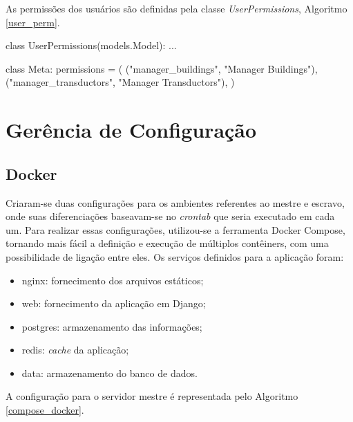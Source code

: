 As permissões dos usuários são definidas pela classe \textit{UserPermissions}, Algoritmo \ref{user_perm}.

\begin{python}[caption={Permissões presentes na classe \textit{UserPermissions}.}, captionpos=b,label={user_perm}]
class UserPermissions(models.Model):
    ...

    class Meta:
        permissions = (
            ("manager_buildings", "Manager Buildings"),
            ("manager_transductors", "Manager Transductors"),
        )
\end{python}

\section{Gerência de Configuração}

\subsection{Docker}
Criaram-se duas configurações para os ambientes referentes ao mestre e escravo, onde suas diferenciações baseavam-se no \textit{crontab} que seria executado em cada um. Para realizar essas configurações, utilizou-se a ferramenta Docker Compose, tornando mais fácil a definição e execução de múltiplos contêiners, com uma possibilidade de ligação entre eles. Os serviços definidos para a aplicação foram:

\begin{itemize}
    \item nginx: fornecimento dos arquivos estáticos;
    \item web: fornecimento da aplicação em Django;
    \item postgres: armazenamento das informações;
    \item redis: \textit{cache} da aplicação;
    \item data: armazenamento do banco de dados.
\end{itemize}

A configuração para o servidor mestre é representada pelo Algoritmo \ref{compose_docker}.

